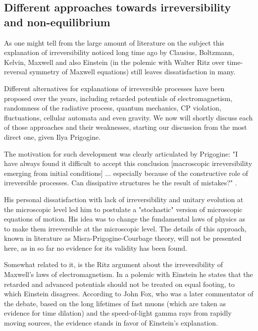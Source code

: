 \documentclass[a4paper,12pt]{article}
\begin{document}
\subsection{Different approaches towards irreversibility and non-equilibrium}

As one might tell from the large amount of literature on the subject \cite{Doyle:wf} \cite{Layzer:1970dx} \cite{Wolfram:552851} \cite{Rovelli:2015tv} \cite{Courbage:1983eo} %
this explanation of irreversibility noticed long time ago by Clausius, Boltzmann\cite{Wolfram:552851}, Kelvin, Maxwell\cite{Anonymous:0uVSJOI5} and also Einstein (in the polemic with Walter Ritz over time-reversal symmetry of Maxwell equations) still leaves dissatisfaction in many.

Different alternatives for explanations of irreversible processes have been proposed over the years, including retarded potentials of electromagnetism, randomness of the radiative process, quantum mechanics, CP violation, fluctuations, cellular automata and even gravity. We now will shortly discuss each of those approaches and their weaknesses, starting our discussion from the most direct one, given Ilya Prigogine.

The motivation for such development was clearly articulated by Prigogine:
"I have always found it difficult to accept this conclusion [macroscopic irreversibility emerging from initial conditions] {...} especially because of the constructive role of irreversible processes. Can dissipative structures be the result of mistakes?" \cite{Prigogine:1978kz}.

His personal dissatisfaction with lack of irreversibility and unitary evolution at the microscopic level led him to postulate a "stochastic" version of microscopic equations of motion. His idea was to change the fundamental laws of physics as to make them irreversible at the microscopic level. The details of this approach, known in literature as Misra-Prigogine-Courbage theory\cite{Courbage:1983eo}, will not be presented here, as in so far no evidence for its validity has been found\cite{Bricmont:7zJsfTpK}.

Somewhat related to it, is the Ritz argument about the irreversibility of Maxwell's laws of electromagnetism. In a polemic with Einstein he states that the retarded and advanced potentials should not be treated on equal footing, to which Einstein disagrees. 
According to John Fox, who was a later commentator of the debate, based on the long lifetimes of fast muons (which are taken as evidence for time dilation) and the speed-of-light gamma rays from rapidly moving sources, the evidence stands in favor of Einstein's explanation\cite{Fox:1965bg}.
\end{document}
